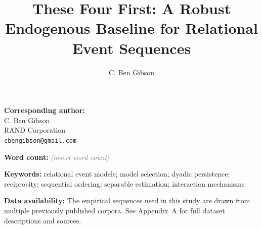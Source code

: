 \documentclass[11pt]{article}
\title{These Four First: A Robust Endogenous Baseline for Relational Event Sequences}
\author[1]{C. Ben Gibson}
\affil[1]{Economics, Sociology, and Statistics, RAND Corporation}
\date{}
\newcommand{\placeholder}[1]{\textcolor{gray}{\textit{[#1]}}}
\begin{document}
\maketitle
\thispagestyle{empty}

\bigskip
\noindent\textbf{Corresponding author:}\\
C. Ben Gibson\\
RAND Corporation\\
\texttt{cbengibson@gmail.com}

\bigskip
\noindent\textbf{Word count:} \placeholder{insert word count}

\bigskip
\noindent\textbf{Keywords:} relational event models; model selection; dyadic persistence;
reciprocity; sequential ordering; separable estimation; interaction mechanisms

\bigskip
\noindent\textbf{Data availability:} The empirical sequences used in this study are drawn
from multiple previously published corpora. See Appendix~A for full dataset descriptions
and sources.
\end{document}

